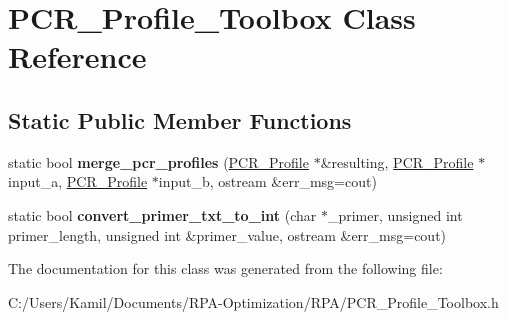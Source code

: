 \hypertarget{class_p_c_r___profile___toolbox}{}\section{P\+C\+R\+\_\+\+Profile\+\_\+\+Toolbox Class Reference}
\label{class_p_c_r___profile___toolbox}
\subsection*{Static Public Member Functions}
\begin{DoxyCompactItemize}
\item 
\mbox{\label{class_p_c_r___profile___toolbox_a464d4e49e62837b23870850445fb4bcb}} 
static bool {\bfseries merge\+\_\+pcr\+\_\+profiles} (\mbox{\hyperlink{class_p_c_r___profile}{P\+C\+R\+\_\+\+Profile}} $\ast$\&resulting, \mbox{\hyperlink{class_p_c_r___profile}{P\+C\+R\+\_\+\+Profile}} $\ast$input\+\_\+a, \mbox{\hyperlink{class_p_c_r___profile}{P\+C\+R\+\_\+\+Profile}} $\ast$input\+\_\+b, ostream \&err\+\_\+msg=cout)
\item 
\mbox{\label{class_p_c_r___profile___toolbox_a76b955a9a945af8160e34bfa03949841}} 
static bool {\bfseries convert\+\_\+primer\+\_\+txt\+\_\+to\+\_\+int} (char $\ast$\+\_\+primer, unsigned int primer\+\_\+length, unsigned int \&primer\+\_\+value, ostream \&err\+\_\+msg=cout)
\end{DoxyCompactItemize}


The documentation for this class was generated from the following file\+:\begin{DoxyCompactItemize}
\item 
C\+:/\+Users/\+Kamil/\+Documents/\+R\+P\+A-\/\+Optimization/\+R\+P\+A/P\+C\+R\+\_\+\+Profile\+\_\+\+Toolbox.\+h\end{DoxyCompactItemize}
